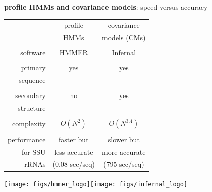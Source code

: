 \documentclass[landscape]{slides}
\begin{document}
\begin{slide}
\begin{center}
\textbf{profile HMMs and covariance models}: speed versus accuracy
\end{center}
\medskip


\begin{minipage}{6in}
\begin{center}
\small
\begin{tabular}{r|cc|} 
             & profile & covariance  \\
             & HMMs    & models (CMs) \\ \hline
  & & \\
  software   & {\sc HMMER}     & {\sc Infernal} \\ 
  & & \\
  primary & yes & yes \\
  sequence & & \\
  & & \\
  secondary & no & yes \\
  structure & & \\
  & & \\
  complexity & $O(N^2)$ & $O(N^{3.4})$ \\
  & & \\
  performance& faster but    & slower but    \\
  for SSU    & less accurate      & more accurate \\
  rRNAs      & (0.08 sec/seq)     & (795 sec/seq) \\
\end{tabular}
\end{center}
\hspace{2.1in}\texttt{[image: figs/hmmer\_logo]}\hspace{0.65in}\texttt{[image: figs/infernal\_logo]}


\end{minipage}
\end{slide}
\end{document}
